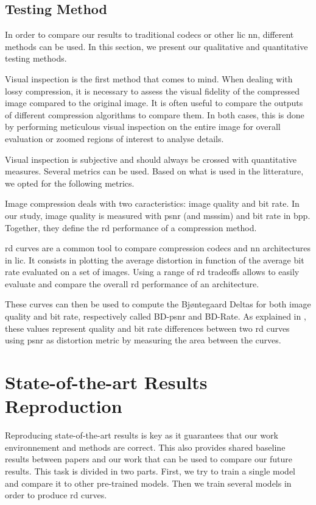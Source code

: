 \subsection{Testing Method}
In order to compare our results to traditional codecs or other \acrshort{lic} \acrshort{nn}, different methods can be used. In this section, we present our qualitative and quantitative testing methods.

Visual inspection is the first method that comes to mind. When dealing with lossy compression, it is necessary to assess the visual fidelity of the compressed image compared to the original image. It is often useful to compare the outputs of different compression algorithms to compare them. In both cases, this is done by performing meticulous visual inspection on the entire image for overall evaluation or zoomed regions of interest to analyse details.

Visual inspection is subjective and should always be crossed with quantitative measures. Several metrics can be used. Based on what is used in the litterature, we opted for the following metrics.

Image compression deals with two caracteristics: image quality and bit rate. In our study, image quality is measured with \acrfull{psnr} (and \acrfull{msssim}) and bit rate in \acrfull{bpp}. Together, they define the \acrfull{rd} performance of a compression method.

\acrshort{rd} curves are a common tool to compare compression codecs and \acrshort{nn} architectures in \acrshort{lic}. It consists in plotting the average distortion in function of the average bit rate evaluated on a set of images. Using a range of \acrshort{rd} tradeoffs allows to easily evaluate and compare the overall \acrshort{rd} performance of an architecture.

These curves can then be used to compute the Bjøntegaard Deltas for both image quality and bit rate, respectively called BD-\acrshort{psnr} and BD-Rate. As explained in \cite{barman2024bjontegaarddeltabdtutorial}, these values represent quality and bit rate differences between two \acrshort{rd} curves using \acrshort{psnr} as distortion metric by measuring the area between the curves. %

\section{State-of-the-art Results Reproduction}
Reproducing state-of-the-art results is key as it guarantees that our work environnement and methods are correct. This also provides shared baseline results between papers and our work that can be used to compare our future results. This task is divided in two parts. First, we try to train a single model and compare it to other pre-trained models. Then we train several models in order to produce \acrshort{rd} curves.

